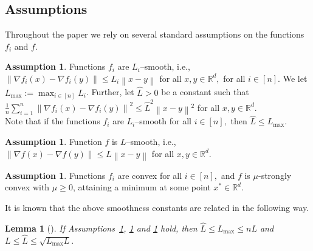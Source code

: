 \documentclass{article} %
\newcommand{\norm}[1]{\left\| #1 \right\|}
\newcommand{\R}{\mathbb{R}} %
\theoremstyle{plain}
\newtheorem{lemma}[theorem]{Lemma}
\theoremstyle{definition}
\newtheorem{assumption}[theorem]{Assumption}
\theoremstyle{remark}
\newcommand{\eqdef}{:=}
\begin{document}
\subsection{Assumptions}

Throughout the paper we rely on several standard assumptions on the functions $f_i$ and $f.$

\begin{assumption}
  \label{ass:workers_lipschitz_constant}
Functions $f_i$ are $L_i$--smooth, i.e., 
  $\norm{\nabla f_i(x) - \nabla f_i(y)} \leq L_i \norm{x - y}$ for all $x, y \in \R^d,$ for all $i \in [n].$
We let $L_{\max} \eqdef \max_{i \in [n]} L_i$. Further, let $\widehat{L}>0$ be a constant such that
  $\frac{1}{n} \sum_{i=1}^n \norm{\nabla f_i(x) - \nabla f_i(y)}^2 \leq \widehat{L}^2 \norm{x - y}^2$ for all $x, y \in \R^d.$\\
  Note that if the functions $f_i$ are $L_i$--smooth for all $i \in [n],$ then $\widehat{L} \leq L_{\max}.$
\end{assumption}
\begin{assumption}
  \label{ass:lipschitz_constant}
Function $f$ is $L$--smooth, i.e., $\norm{\nabla f(x) - \nabla f(y)} \leq L \norm{x - y}$ for all $x, y \in \R^d$.
\end{assumption}
\begin{assumption}
  \label{ass:convex}
Functions $f_i$ are convex for all $i \in [n],$ and  $f$ is $\mu$-strongly convex with $\mu \geq 0$, attaining a minimum at some point $x^* \in \R^d.$    
\end{assumption}
It is known that the above smoothness constants are related in the following way.
\begin{lemma}[\citet{gruntkowska2022ef21}]
  \label{lemma:lipt_constants}
If Assumptions~\ref{ass:lipschitz_constant}, \ref{ass:workers_lipschitz_constant} and \ref{ass:convex} hold, then $\widehat{L} \leq L_{\max} \leq n L$ and $L \leq \widehat{L} \leq \sqrt{L_{\max} L}.$
\end{lemma}
\end{document}
